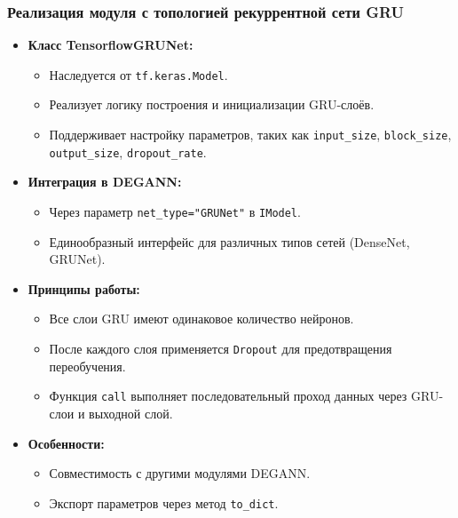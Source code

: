\documentclass
  [ russian
  , aspectratio=1610 %
  ] {beamer}
\begin{document}
\begin{frame}
    \frametitle{Реализация модуля с топологией рекуррентной сети GRU}
    \begin{itemize}
        \item \textbf{Класс TensorflowGRUNet:}
        \begin{itemize}
            \item Наследуется от \texttt{tf.keras.Model}.
            \item Реализует логику построения и инициализации GRU-слоёв.
            \item Поддерживает настройку параметров, таких как \texttt{input\_size}, \texttt{block\_size}, \texttt{output\_size}, \texttt{dropout\_rate}.
        \end{itemize}
        \item \textbf{Интеграция в DEGANN:}
        \begin{itemize}
            \item Через параметр \texttt{net\_type="GRUNet"} в \texttt{IModel}.
            \item Единообразный интерфейс для различных типов сетей (DenseNet, GRUNet).
        \end{itemize}
        \item \textbf{Принципы работы:}
        \begin{itemize}
            \item Все слои GRU имеют одинаковое количество нейронов.
            \item После каждого слоя применяется \texttt{Dropout} для предотвращения переобучения.
            \item Функция \texttt{call} выполняет последовательный проход данных через GRU-слои и выходной слой.
        \end{itemize}
        \item \textbf{Особенности:}
        \begin{itemize}
            \item Совместимость с другими модулями DEGANN.
            \item Экспорт параметров через метод \texttt{to\_dict}.
        \end{itemize}
    \end{itemize}
\end{frame}
\end{document}

